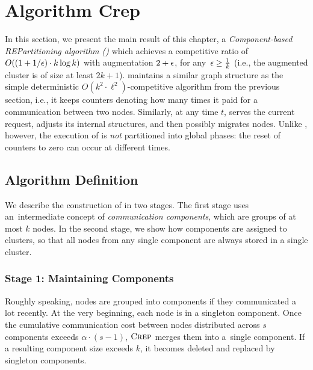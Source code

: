 
\section{Algorithm {\sc Crep}}
\label{sec:crep}

In this section, we present the main result of this chapter, a
\emph{Component-based REPartitioning algorithm (\CREP)} which achieves a
competitive ratio of $O((1 + 1/\epsilon) \cdot k \log k)$ with augmentation
$2+\epsilon$, for any~$\epsilon \geq \frac{1}{k}$ (i.e., the augmented cluster
is of size at least $2k+1$). \CREP maintains a similar graph structure as the
simple deterministic $O(k^2 \cdot \ell^2)$-competitive algorithm from the
previous section, i.e., it keeps counters denoting how many times it paid for a
communication between two nodes. Similarly, at any time $t$,
\CREP serves the current request, adjusts its internal structures, and then
possibly migrates nodes. Unlike \DET, however, the execution of \CREP is
\emph{not} partitioned into global phases: the reset of counters to zero can
occur at different times.


\subsection{Algorithm Definition}

We describe the construction of \CREP in two stages. The first stage uses
an~intermediate concept of \emph{communication components}, which are groups of at
most $k$ nodes. In the second stage, we show how components are assigned to
clusters, so that all nodes from any single component are always stored in a
single cluster.


\subsubsection{Stage 1: Maintaining Components}

Roughly speaking, nodes are grouped into components if they communicated a lot
recently. At the very beginning, each node is in a singleton component. Once
the cumulative communication cost between nodes distributed across $s$
components exceeds $\alpha \cdot (s-1)$, $\textsc{Crep}$ merges them into a~single
component. If a resulting component size exceeds $k$, it becomes deleted and
replaced by singleton components.

